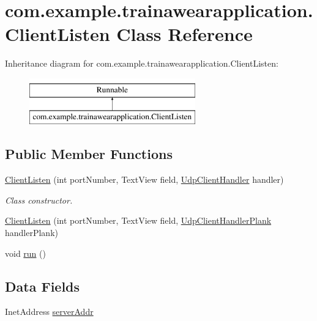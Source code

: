 \hypertarget{classcom_1_1example_1_1trainawearapplication_1_1_client_listen}{}\section{com.\+example.\+trainawearapplication.\+Client\+Listen Class Reference}
\label{classcom_1_1example_1_1trainawearapplication_1_1_client_listen}
Inheritance diagram for com.\+example.\+trainawearapplication.\+Client\+Listen\+:\begin{figure}[H]
\begin{center}
\leavevmode
\includegraphics[height=2.000000cm]{classcom_1_1example_1_1trainawearapplication_1_1_client_listen}
\end{center}
\end{figure}
\subsection*{Public Member Functions}
\begin{DoxyCompactItemize}
\item 
\mbox{\hyperlink{classcom_1_1example_1_1trainawearapplication_1_1_client_listen_a24ac2c031ded11c7a5ce64dae1694253}{Client\+Listen}} (int port\+Number, Text\+View field, \mbox{\hyperlink{classcom_1_1example_1_1trainawearapplication_1_1_udp_client_handler}{Udp\+Client\+Handler}} handler)
\begin{DoxyCompactList}\small\item\em Class constructor. \end{DoxyCompactList}\item 
\mbox{\hyperlink{classcom_1_1example_1_1trainawearapplication_1_1_client_listen_ae0a26fe4b938f8a52e10e6f43665e23c}{Client\+Listen}} (int port\+Number, Text\+View field, \mbox{\hyperlink{classcom_1_1example_1_1trainawearapplication_1_1_udp_client_handler_plank}{Udp\+Client\+Handler\+Plank}} handler\+Plank)
\item 
void \mbox{\hyperlink{classcom_1_1example_1_1trainawearapplication_1_1_client_listen_adcb69d9825d6d9e182905cf9b4aa4d7d}{run}} ()
\end{DoxyCompactItemize}
\subsection*{Data Fields}
\begin{DoxyCompactItemize}
\item 
Inet\+Address \mbox{\hyperlink{classcom_1_1example_1_1trainawearapplication_1_1_client_listen_abc9e0b9f60e38782a9aa64dde9b43273}{server\+Addr}}
\end{DoxyCompactItemize}
